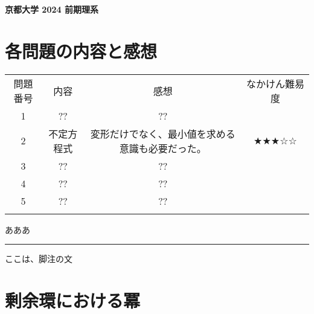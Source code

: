 \documentclass[11pt]{article}
\begin{document}
\begin{center}
{\LARGE \textbf{京都大学 2024 前期理系}}
\end{center}
\vspace{2mm}

\section*{各問題の内容と感想}

\renewcommand{\arraystretch}{1.3} %
\begin{tabular}{!{\vrule width 1pt}c!{\vrule width 1pt}c!{\vrule width 1pt}c!{\vrule width 1pt}c!{\vrule width 1pt}}
\Xhline{1pt}
 問題番号 & 内容 & 感想 & なかけん難易度\\
\Xhline{1pt} %
1 & ?? & ?? & \\
\Xhline{1pt}
2 & 不定方程式 & 変形だけでなく、最小値を求める意識も必要だった。 & ★★★☆☆\\
\Xhline{1pt}
3 & ?? & ?? & \\
\Xhline{1pt}
4 & ?? & ?? & \\
\Xhline{1pt}
5 & ?? & ?? & \\
\Xhline{1pt}
\end{tabular}

\vspace{1cm}

あああ
\vfill
\hrule
\vspace{1mm}
{\footnotesize ここは、脚注の文}

\newpage

\section{剰余環における冪}
\end{document}
